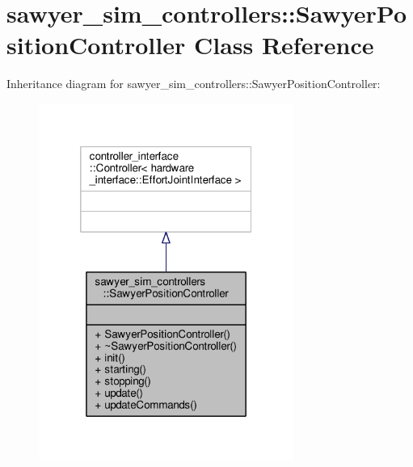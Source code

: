 \hypertarget{classsawyer__sim__controllers_1_1_sawyer_position_controller}{\section{sawyer\-\_\-sim\-\_\-controllers\-:\-:Sawyer\-Position\-Controller Class Reference}
\label{classsawyer__sim__controllers_1_1_sawyer_position_controller}
}


Inheritance diagram for sawyer\-\_\-sim\-\_\-controllers\-:\-:Sawyer\-Position\-Controller\-:\nopagebreak
\begin{figure}[H]
\begin{center}
\leavevmode
\includegraphics[width=236pt]{classsawyer__sim__controllers_1_1_sawyer_position_controller__inherit__graph}
\end{center}
\end{figure}


